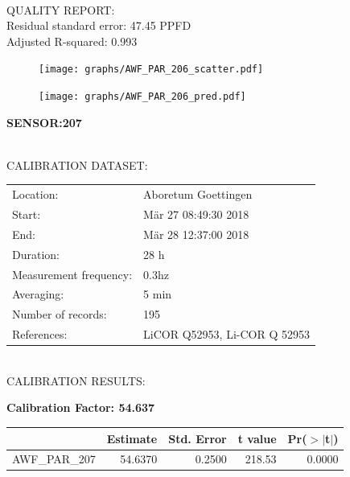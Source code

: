 \documentclass[oneside]{report}
\begin{document}
\hrulefill\\
QUALITY REPORT:\\
Residual standard error: 47.45 PPFD\\
Adjusted R-squared: 0.993



\begin{figure}[H]
  \centering
  \texttt{[image: graphs/AWF\_PAR\_206\_scatter.pdf]}
\end{figure}




\begin{figure}[H]
  \centering
  \texttt{[image: graphs/AWF\_PAR\_206\_pred.pdf]}
\end{figure}

\pagebreak


\begin{center}
\large{\textbf{SENSOR:207}}\\
\end{center}

\hrulefill\\
CALIBRATION DATASET:\\
\begin{table}[h!]
  \centering
  \label{tab:table1}
  \begin{tabular}{ll}
    Location: & Aboretum Goettingen\\ 
    
    
    Start:  & Mär 27 08:49:30 2018 \\
    End:   & Mär 28 12:37:00 2018\\ 
    Duration: & 28 h\\
    Measurement frequency: & 0.3hz\\
    Averaging:  &5 min\\
    Number of records: & 195 \\
    References: & LiCOR Q52953, Li-COR Q 52953 \\
  \end{tabular}
\end{table}

\hrulefill\\
CALIBRATION RESULTS:\\


\begin{center}
\textbf{\large{Calibration Factor: 54.637}}\\
\end{center}
\begin{table}[ht]
\centering
\begin{tabular}{rrrrr}
  \hline
 & Estimate & Std. Error & t value & Pr($>$$|$t$|$) \\ 
  \hline
AWF\_PAR\_207 & 54.6370 & 0.2500 & 218.53 & 0.0000 \\ 
   \hline
\end{tabular}
\end{table}
\end{document}
